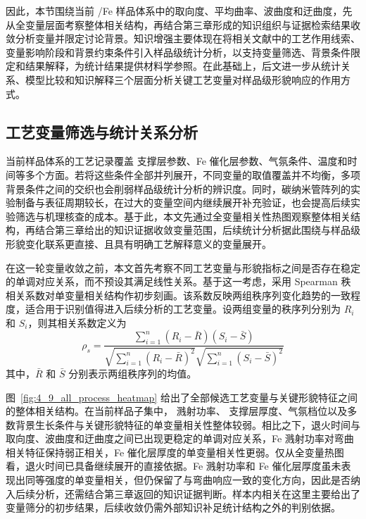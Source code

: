 因此，本节围绕当前 /Fe 样品体系中的取向度、平均曲率、波曲度和迂曲度，先从全变量层面考察整体相关结构，再结合第三章形成的知识组织与证据检索结果收敛分析变量并限定讨论背景。知识增强主要体现在将相关文献中的工艺作用线索、变量影响阶段和背景约束条件引入样品级统计分析，以支持变量筛选、背景条件限定和结果解释，为统计结果提供材料学参照。在此基础上，后文进一步从统计关系、模型比较和知识解释三个层面分析关键工艺变量对样品级形貌响应的作用方式。

\subsection{工艺变量筛选与统计关系分析}

当前样品体系的工艺记录覆盖  支撑层参数、Fe 催化层参数、气氛条件、温度和时间等多个方面。若将这些条件全部并列展开，不同变量的取值覆盖并不均衡，多项背景条件之间的交织也会削弱样品级统计分析的辨识度。同时，碳纳米管阵列的实验制备与表征周期较长，在过大的变量空间内继续展开补充验证，也会提高后续实验筛选与机理核查的成本。基于此，本文先通过全变量相关性热图观察整体相关结构，再结合第三章给出的知识证据收敛变量范围，后续统计分析据此围绕与样品级形貌变化联系更直接、且具有明确工艺解释意义的变量展开。

在这一轮变量收敛之前，本文首先考察不同工艺变量与形貌指标之间是否存在稳定的单调对应关系，而不预设其满足线性关系。基于这一考虑，采用 Spearman 秩相关系数\cite{Spearman1904Association}对单变量相关结构作初步刻画。该系数反映两组秩序列变化趋势的一致程度，适合用于识别值得进入后续分析的工艺变量。设两组变量的秩序列分别为 $R_i$ 和 $S_i$，则其相关系数定义为
\begin{equation}
    \rho_s=
    \frac{\sum_{i=1}^{n}(R_i-\bar{R})(S_i-\bar{S})}
    {\sqrt{\sum_{i=1}^{n}(R_i-\bar{R})^2}\sqrt{\sum_{i=1}^{n}(S_i-\bar{S})^2}}
\label{eq:4_21_spearman}
\end{equation}
其中，$\bar{R}$ 和 $\bar{S}$ 分别表示两组秩序列的均值。

图~\ref{fig:4_9_all_process_heatmap} 给出了全部候选工艺变量与关键形貌特征之间的整体相关结构。在当前样品子集中， 溅射功率、 支撑层厚度、气氛档位以及多数背景生长条件与关键形貌特征的单变量相关性整体较弱。相比之下，退火时间与取向度、波曲度和迂曲度之间已出现更稳定的单调对应关系，Fe 溅射功率对弯曲相关特征保持弱正相关，Fe 催化层厚度的单变量相关性更弱。仅从全变量热图看，退火时间已具备继续展开的直接依据。Fe 溅射功率和 Fe 催化层厚度虽未表现出同等强度的单变量相关，但仍保留了与弯曲响应一致的变化方向，因此是否纳入后续分析，还需结合第三章返回的知识证据判断。样本内相关在这里主要给出了变量筛分的初步结果，后续收敛仍需外部知识补足统计结构之外的判别依据。

